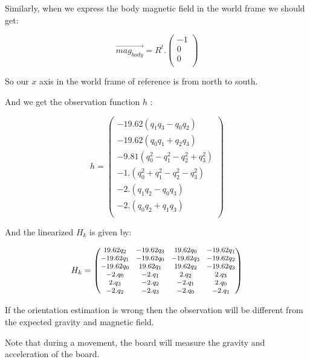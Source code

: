 \documentclass[titlepage,a4,12pt]{article}
\newenvironment{mpmatrix}{\begin{medsize}\begin{pmatrix}}%
{\end{pmatrix}\end{medsize}}%
\numberwithin{equation}{subsection}
\begin{document}
Similarly, when we express the body magnetic field in the world frame we should get:

\begin{equation}\label{eq:magworld}
\overrightarrow{mag_{body}} = R^t . \left(
\begin{array}{c}
 -1 \\
 0 \\
 0 \\
\end{array}
\right)
\end{equation}

So our $x$ axis in the world frame of reference is from north to south.

And we get the observation function $h$ :

\begin{equation}\label{eq:h}
h = \left(
\begin{array}{c}
 -19.62 (q_1 q_3-q_0 q_2) \\
 -19.62 (q_0 q_1+q_2 q_3) \\
 -9.81 \left(q_0^2-q_1^2-q_2^2+q_3^2\right) \\
 -1. \left(q_0^2+q_1^2-q_2^2-q_3^2\right) \\
 -2. (q_1 q_2-q_0 q_3) \\
 -2. (q_0 q_2+q_1 q_3) \\
\end{array}
\right)
\end{equation}

And the linearized $H_k$ is given by:

\begin{equation}\label{eq:Hmatrix}
H_k=\begin{mpmatrix}
 19.62 q_2 & -19.62 q_3 & 19.62 q_0 & -19.62 q_1 \\
 -19.62 q_1 & -19.62 q_0 & -19.62 q_3 & -19.62 q_2 \\
 -19.62 q_0 & 19.62 q_1 & 19.62 q_2 & -19.62 q_3 \\
 -2. q_0 & -2. q_1 & 2. q_2 & 2. q_3 \\
 2. q_3 & -2. q_2 & -2. q_1 & 2. q_0 \\
 -2. q_2 & -2. q_3 & -2. q_0 & -2. q_1 \\
\end{mpmatrix}
\end{equation}

If the orientation estimation is wrong then the observation will be different from the expected gravity and magnetic field.

Note that during a movement, the board will measure the gravity and acceleration of the board.
\end{document}
